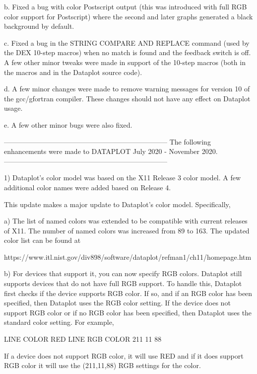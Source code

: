     b. Fixed a bug with color Postscript output (this was introduced
       with full RGB color support for Postscript) where the second
       and later graphs generated a black background by default.

    c. Fixed a bug in the STRING COMPARE AND REPLACE command (used
       by the DEX 10-step macros) when no match is found and the
       feedback switch is off.  A few other minor tweaks were made
       in support of the 10-step macros (both in the macros and in
       the Dataplot source code).

    d. A few minor changes were made to remove warning messages for
       version 10 of the gcc/gfortran compiler.  These changes should
       not have any effect on Dataplot usage.

    e. A few other minor bugs were also fixed.

-----------------------------------------------------------------------
The following enhancements were made to DATAPLOT
July 2020 - November 2020.
-----------------------------------------------------------------------

 1) Dataplot's color model was based on the X11 Release 3 color
    model.  A few additional color names were added based on
    Release 4.

    This update makes a major update to Dataplot's color model.
    Specifically,

    a) The list of named colors was extended to be compatible
       with current releases of X11.  The number of named colors
       was increased from 89 to 163.  The updated color list can
       be found at

          https://www.itl.nist.gov/div898/software/dataplot/refman1/ch11/homepage.htm

    b) For devices that support it, you can now specify RGB colors.
       Dataplot still supports devices that do not have full RGB
       support.  To handle this, Dataplot first checks if the
       device supports RGB color.  If so, and if an RGB color has
       been specified, then Dataplot uses the RGB color setting.
       If the device does not support RGB color or if no RGB color
       has been specified, then Dataplot uses the standard color
       setting.  For example,

           LINE COLOR RED
           LINE RGB COLOR 211 11 88

       If a device does not support RGB color, it will use RED and
       if it does support RGB color it will use the (211,11,88)
       RGB settings for the color.

